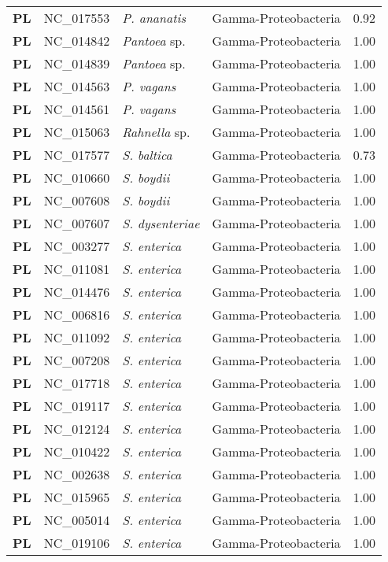 \begin{adjustwidth}{-3cm}{2cm}
{\begin{supertabular}{>{\bfseries}l|p{0.1\textwidth}p{0.14\textwidth}l|l}
PL & NC\_017553 & \textit{P. ananatis} & Gamma-Proteobacteria & 0.92\\
PL & NC\_014842 & \textit{Pantoea} sp. & Gamma-Proteobacteria & 1.00\\
PL & NC\_014839 & \textit{Pantoea} sp. & Gamma-Proteobacteria & 1.00\\
PL & NC\_014563 & \textit{P. vagans} & Gamma-Proteobacteria & 1.00\\
PL & NC\_014561 & \textit{P. vagans} & Gamma-Proteobacteria & 1.00\\
PL & NC\_015063 & \textit{Rahnella} sp. & Gamma-Proteobacteria & 1.00\\
PL & NC\_017577 & \textit{S. baltica} & Gamma-Proteobacteria & 0.73\\
PL & NC\_010660 & \textit{S. boydii} & Gamma-Proteobacteria & 1.00\\
PL & NC\_007608 & \textit{S. boydii} & Gamma-Proteobacteria & 1.00\\
PL & NC\_007607 & \textit{S. dysenteriae} & Gamma-Proteobacteria & 1.00\\
PL & NC\_003277 & \textit{S. enterica} & Gamma-Proteobacteria & 1.00\\
PL & NC\_011081 & \textit{S. enterica} & Gamma-Proteobacteria & 1.00\\
PL & NC\_014476 & \textit{S. enterica} & Gamma-Proteobacteria & 1.00\\
PL & NC\_006816 & \textit{S. enterica} & Gamma-Proteobacteria & 1.00\\
PL & NC\_011092 & \textit{S. enterica} & Gamma-Proteobacteria & 1.00\\
PL & NC\_007208 & \textit{S. enterica} & Gamma-Proteobacteria & 1.00\\
PL & NC\_017718 & \textit{S. enterica} & Gamma-Proteobacteria & 1.00\\
PL & NC\_019117 & \textit{S. enterica} & Gamma-Proteobacteria & 1.00\\
PL & NC\_012124 & \textit{S. enterica} & Gamma-Proteobacteria & 1.00\\
PL & NC\_010422 & \textit{S. enterica} & Gamma-Proteobacteria & 1.00\\
PL & NC\_002638 & \textit{S. enterica} & Gamma-Proteobacteria & 1.00\\
PL & NC\_015965 & \textit{S. enterica} & Gamma-Proteobacteria & 1.00\\
PL & NC\_005014 & \textit{S. enterica} & Gamma-Proteobacteria & 1.00\\
PL & NC\_019106 & \textit{S. enterica} & Gamma-Proteobacteria & 1.00\\

\end{supertabular}}
\end{adjustwidth}
